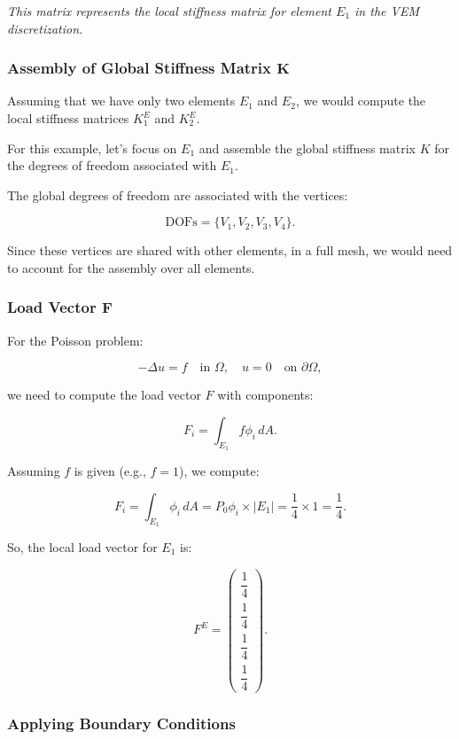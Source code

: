 \documentclass[class=article, crop=false]{standalone}
\begin{document}
\noindent
\textit{This matrix represents the local stiffness matrix for element $E_1$ in the VEM discretization.}

\subsubsection{Assembly of Global Stiffness Matrix $\boldsymbol{K}$}

Assuming that we have only two elements $E_1$ and $E_2$, we would compute the local stiffness matrices $K_1^E$ and $K_2^E$.

For this example, let's focus on $E_1$ and assemble the global stiffness matrix $K$ for the degrees of freedom associated with $E_1$.

The global degrees of freedom are associated with the vertices:

\[
\text{DOFs} = \{ V_1, V_2, V_3, V_4 \}.
\]

Since these vertices are shared with other elements, in a full mesh, we would need to account for the assembly over all elements.

\subsubsection{Load Vector $\boldsymbol{F}$}

For the Poisson problem:

\[
- \Delta u = f \quad \text{in } \Omega, \quad u = 0 \quad \text{on } \partial\Omega,
\]

we need to compute the load vector $F$ with components:

\[
F_i = \int_{E_1} f \phi_i \, dA.
\]

Assuming $f$ is given (e.g., $f = 1$), we compute:

\[
F_i = \int_{E_1} \phi_i \, dA = P_0 \phi_i \times |E_1| = \dfrac{1}{4} \times 1 = \dfrac{1}{4}.
\]

So, the local load vector for $E_1$ is:

\[
F^E = \begin{pmatrix}
\dfrac{1}{4} \\
\dfrac{1}{4} \\
\dfrac{1}{4} \\
\dfrac{1}{4}
\end{pmatrix}.
\]

\subsubsection{Applying Boundary Conditions}
\end{document}
